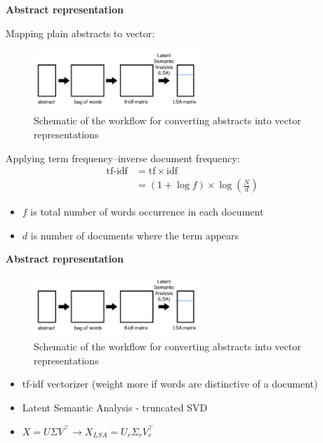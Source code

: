 \begin{frame}{\textbf{Abstract representation}}

Mapping plain abstracts to vector:

\begin{figure}
\includegraphics[width=2.5in]{images/algorithm_flow}\\
\tiny{Schematic of the workflow for converting abstracts into vector representations}
\end{figure}

Applying term frequency--inverse document frequency:
\begin{equation*}
\begin{split}
\text{tf-idf} &= \text{tf} \times \text{idf}\\
&=  (1 + \log f) \times \log \left( \frac{N}{ d } \right)
\end{split}
\end{equation*}

\begin{itemize}
\item $f$ is total number of words occurrence in each document
\item $d$ is number of documents where the term appears
\end{itemize}

\end{frame}


\begin{frame}{\textbf{Abstract representation}}

\begin{figure}
\includegraphics[width=2.5in]{images/algorithm_flow}\\
\tiny{Schematic of the workflow for converting abstracts into vector representations}
\end{figure}


\begin{itemize}
\item tf-idf vectorizer (weight more if words are distinctive of a document)
\item Latent Semantic Analysis - truncated SVD
\item $X = U \Sigma V^\intercal  \rightarrow X_{LSA} = U_r \Sigma_r V_r^\intercal$
\end{itemize}

\end{frame}


